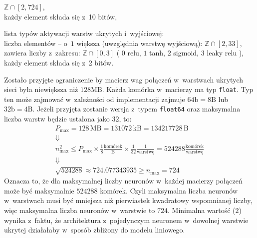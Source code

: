 \begin{nospitemize}
\begin{nospitemize}
          $\mathbb{Z} \cap \left[2, 724\right]$,
        \\\hspace*{1em}każdy element
          składa się z~10 bitów,
      \item lista typów aktywacji
        warstw ukrytych i~wyjściowej:
          \\\hspace*{1em}liczba elementów -- o~$1$ większa
            (uwzględnia warstwę wyjściową):
            $\mathbb{Z} \cap \left[2, 33\right]$,
          \\\hspace*{1em}zawiera liczby z~zakresu:
            $\mathbb{Z} \cap \left[0, 3\right]$
            (%
              $0$ {\textrightarrow} relu,
              $1$ {\textrightarrow} tanh,
              $2$ {\textrightarrow} sigmoid,
              $3$ {\textrightarrow} leaky relu%
            ),
          \\\hspace*{1em}każdy element
            składa się z~2 bitów.
    \end{nospitemize}
\end{nospitemize}

Zostało przyjęte ograniczenie by macierz
wag połączeń w~warstwach ukrytych sieci
była niewiększa niż $128\text{MB}$.
Każda komórka w~macierzy ma typ \texttt{float}.
Typ ten może zajmować w~zależności
od implementacji zajmuje $64\text{b} = 8\text{B}$
lub $32\text{b} = 4\text{B}$.
Jeżeli przyjęta zostanie wersja z~typem
\texttt{float64} oraz maksymalna liczba
warstw będzie ustalona jako $32$, to:
\begin{equation}
  \begin{gathered}
    P_{\max}
      = 128\,\text{MB}
      = 131072\,\text{kB}
      = 134217728\,\text{B}\\
    \Downarrow\\
    n_{\max}^2
      \leqslant P_{\max}
        \times \frac{1}{8}\frac{\text{komórek}}{\text{B}}
        \times \frac{1}{32}\frac{1}{\text{warstwę}}
      = 524288\frac{\text{komórek}}{\text{warstwę}}\\
    \Downarrow\\
    \sqrt{524288}
      \approx 724.077343935
      \geqslant n_{\max} = 724
  \end{gathered}
\end{equation}
Oznacza to, że dla maksymalnej liczby
neuronów w~każdej macierzy połączeń
może być maksymalnie $524288$ komórek.
Czyli maksymalna liczba neuronów
w~warstwach musi być mniejsza niż
pierwiastek kwadratowy wspomnianej liczby,
więc maksymalna liczba neuronów w~warstwie to $724$.
Minimalna wartość ($2$) wynika z~faktu,
że architektura z~pojedynczym neuronem
w~dowolnej warstwie ukrytej działałaby
w~sposób zbliżony do modelu liniowego.

